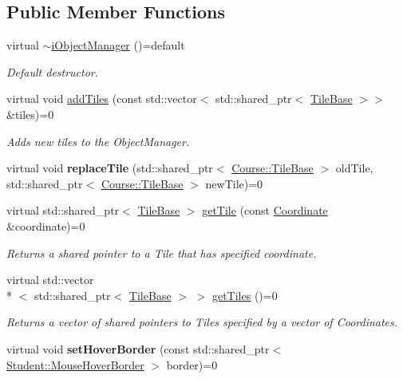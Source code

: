 \subsection*{Public Member Functions}
\begin{DoxyCompactItemize}
\item 
\hypertarget{class_course_1_1i_object_manager_afe7f4ca78e8bcb3d94f92cbcb3e36a6f}{virtual \hyperlink{class_course_1_1i_object_manager_afe7f4ca78e8bcb3d94f92cbcb3e36a6f}{$\sim$i\-Object\-Manager} ()=default}\label{class_course_1_1i_object_manager_afe7f4ca78e8bcb3d94f92cbcb3e36a6f}

\begin{DoxyCompactList}\small\item\em Default destructor. \end{DoxyCompactList}\item 
virtual void \hyperlink{class_course_1_1i_object_manager_a826fa55229bdc23c49f847245fbdda95}{add\-Tiles} (const std\-::vector$<$ std\-::shared\-\_\-ptr$<$ \hyperlink{class_course_1_1_tile_base}{Tile\-Base} $>$$>$ \&tiles)=0
\begin{DoxyCompactList}\small\item\em Adds new tiles to the Object\-Manager. \end{DoxyCompactList}\item 
\hypertarget{class_course_1_1i_object_manager_a26dd3a6b433b23fa9ca65545115ff661}{virtual void {\bfseries replace\-Tile} (std\-::shared\-\_\-ptr$<$ \hyperlink{class_course_1_1_tile_base}{Course\-::\-Tile\-Base} $>$ old\-Tile, std\-::shared\-\_\-ptr$<$ \hyperlink{class_course_1_1_tile_base}{Course\-::\-Tile\-Base} $>$ new\-Tile)=0}\label{class_course_1_1i_object_manager_a26dd3a6b433b23fa9ca65545115ff661}

\item 
virtual std\-::shared\-\_\-ptr$<$ \hyperlink{class_course_1_1_tile_base}{Tile\-Base} $>$ \hyperlink{class_course_1_1i_object_manager_afd7ab74d8a4cfedd50340c1e9096672d}{get\-Tile} (const \hyperlink{class_course_1_1_coordinate}{Coordinate} \&coordinate)=0
\begin{DoxyCompactList}\small\item\em Returns a shared pointer to a Tile that has specified coordinate. \end{DoxyCompactList}\item 
virtual std\-::vector\\*
$<$ std\-::shared\-\_\-ptr$<$ \hyperlink{class_course_1_1_tile_base}{Tile\-Base} $>$ $>$ \hyperlink{class_course_1_1i_object_manager_adbc182a5aeaa8989eb1c91244edbd043}{get\-Tiles} ()=0
\begin{DoxyCompactList}\small\item\em Returns a vector of shared pointers to Tiles specified by a vector of Coordinates. \end{DoxyCompactList}\item 
\hypertarget{class_course_1_1i_object_manager_a8e5f1879b9a3916b2ede8c6e641b3c8b}{virtual void {\bfseries set\-Hover\-Border} (const std\-::shared\-\_\-ptr$<$ \hyperlink{class_student_1_1_mouse_hover_border}{Student\-::\-Mouse\-Hover\-Border} $>$ border)=0}\label{class_course_1_1i_object_manager_a8e5f1879b9a3916b2ede8c6e641b3c8b}


\end{DoxyCompactItemize}
